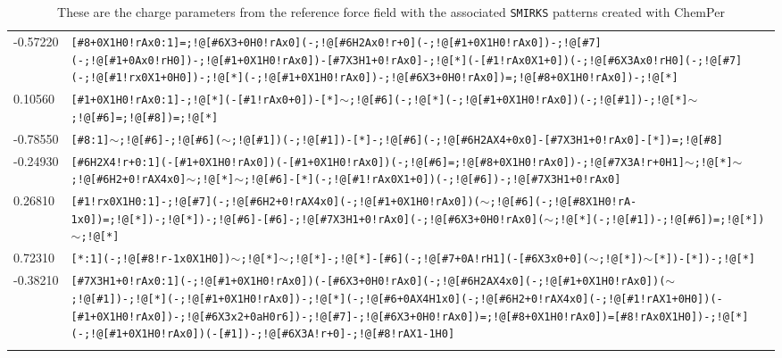 \begin{longtable}{>{\baselineskip=10pt}p{} >{\baselineskip=10pt}p{}}
-0.57220 & \texttt{[\#8+0X1H0!rAx0:1]=;!@[\#6X3+0H0!rAx0](-;!@[\#6H2Ax0!r+0](-;!@[\#1+0X1H0!rAx0])-;!@[\#7](-;!@[\#1+0Ax0!rH0])-;!@[\#1+0X1H0!rAx0])-[\#7X3H1+0!rAx0]-;!@[*](-[\#1!rAx0X1+0])(-;!@[\#6X3Ax0!rH0](-;!@[\#7](-;!@[\#1!rx0X1+0H0])-;!@[*](-;!@[\#1+0X1H0!rAx0])-;!@[\#6X3+0H0!rAx0])=;!@[\#8+0X1H0!rAx0])-;!@[*]} \\ 
0.10560 & \texttt{[\#1+0X1H0!rAx0:1]-;!@[*](-[\#1!rAx0+0])-[*]$\sim$;!@[\#6](-;!@[*](-;!@[\#1+0X1H0!rAx0])(-;!@[\#1])-;!@[*]$\sim$;!@[\#6]=;!@[\#8])=;!@[*]} \\ 
-0.78550 & \texttt{[\#8:1]$\sim$;!@[\#6]-;!@[\#6]($\sim$;!@[\#1])(-;!@[\#1])-[*]-;!@[\#6](-;!@[\#6H2AX4+0x0]-[\#7X3H1+0!rAx0]-[*])=;!@[\#8]} \\ 
-0.24930 & \texttt{[\#6H2X4!r+0:1](-[\#1+0X1H0!rAx0])(-[\#1+0X1H0!rAx0])(-;!@[\#6]=;!@[\#8+0X1H0!rAx0])-;!@[\#7X3A!r+0H1]$\sim$;!@[*]$\sim$;!@[\#6H2+0!rAX4x0]$\sim$;!@[*]$\sim$;!@[\#6]-[*](-;!@[\#1!rAx0X1+0])(-;!@[\#6])-;!@[\#7X3H1+0!rAx0]} \\ 
0.26810 & \texttt{[\#1!rx0X1H0:1]-;!@[\#7](-;!@[\#6H2+0!rAX4x0](-;!@[\#1+0X1H0!rAx0])($\sim$;!@[\#6](-;!@[\#8X1H0!rA-1x0])=;!@[*])-;!@[*])-;!@[\#6]-[\#6]-;!@[\#7X3H1+0!rAx0](-;!@[\#6X3+0H0!rAx0]($\sim$;!@[*](-;!@[\#1])-;!@[\#6])=;!@[*])$\sim$;!@[*]} \\ 
0.72310 & \texttt{[*:1](-;!@[\#8!r-1x0X1H0])$\sim$;!@[*]$\sim$;!@[*]-;!@[*]-[\#6](-;!@[\#7+0A!rH1](-[\#6X3x0+0]($\sim$;!@[*])$\sim$[*])-[*])-;!@[*]} \\ 
-0.38210 & \texttt{[\#7X3H1+0!rAx0:1](-;!@[\#1+0X1H0!rAx0])(-[\#6X3+0H0!rAx0](-;!@[\#6H2AX4x0](-;!@[\#1+0X1H0!rAx0])($\sim$;!@[\#1])-;!@[*](-;!@[\#1+0X1H0!rAx0])-;!@[*](-;!@[\#6+0AX4H1x0](-;!@[\#6H2+0!rAX4x0](-;!@[\#1!rAX1+0H0])(-[\#1+0X1H0!rAx0])-;!@[\#6X3x2+0aH0r6])-;!@[\#7]-;!@[\#6X3+0H0!rAx0])=;!@[\#8+0X1H0!rAx0])=[\#8!rAx0X1H0])-;!@[*](-;!@[\#1+0X1H0!rAx0])(-[\#1])-;!@[\#6X3A!r+0]-;!@[\#8!rAX1-1H0]} \\ 
\caption{These are the charge parameters from the reference force field with the associated \texttt{SMIRKS} patterns created with ChemPer} 
\label{tab:protein_charge}
\end{longtable}


